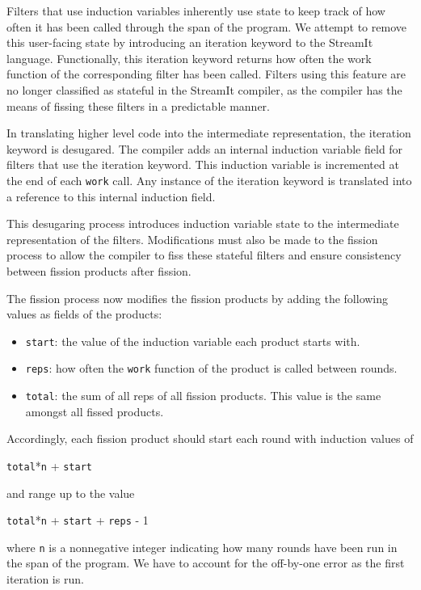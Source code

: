 Filters that use induction variables inherently use state to keep track of
how often it has been called through the span of the program.  We attempt 
to remove this user-facing state by introducing an iteration keyword to the 
StreamIt language.  Functionally, this iteration keyword returns how often 
the work function of the corresponding filter has been called.  Filters 
using this feature are no longer classified as stateful in the StreamIt
compiler, as the compiler has the means of fissing these filters in a 
predictable manner.

In translating higher level code into the intermediate representation, the 
iteration keyword is desugared.  The compiler adds an internal induction 
variable field for filters that use the iteration keyword.  This induction
variable is incremented at the end of each \texttt{work} call.  Any instance
of the iteration keyword is translated into a reference to this internal 
induction field.  

This desugaring process introduces induction variable state to the intermediate
representation of the filters.  Modifications must also be made to the fission 
process to allow the compiler to fiss these stateful filters and ensure 
consistency between fission products after fission.  

The fission process now modifies the fission products by adding the 
following values as fields of the products:
\begin{itemize}
	\item \texttt{start}: the value of the induction variable each product starts with.
	\item \texttt{reps}: how often the \texttt{work} function of the product is 
	  called between rounds.
	\item \texttt{total}: the sum of all reps of all fission products. This value is 
	  the same amongst all fissed products.
\end{itemize}
Accordingly, each fission product should start each round with induction values
of
\begin{center}
\texttt{total}*\texttt{n} + \texttt{start}
\end{center}
and range up to the value
\begin{center}
\texttt{total}*\texttt{n} + \texttt{start} + \texttt{reps} - 1
\end{center}
where \texttt{n} is a nonnegative integer indicating how many rounds have
been run in the span of the program.  We have to account for the off-by-one
error as the first iteration is run.

